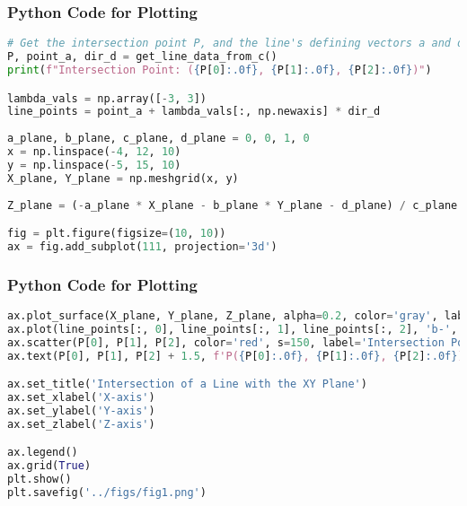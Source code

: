 \documentclass{beamer}
\theoremstyle{remark}
\numberwithin{equation}{section}
\begin{document}
\begin{frame}[fragile]
\frametitle{Python Code for Plotting}
\begin{lstlisting}[language=Python]
# Get the intersection point P, and the line's defining vectors a and d
P, point_a, dir_d = get_line_data_from_c()
print(f"Intersection Point: ({P[0]:.0f}, {P[1]:.0f}, {P[2]:.0f})")

lambda_vals = np.array([-3, 3])
line_points = point_a + lambda_vals[:, np.newaxis] * dir_d
 
a_plane, b_plane, c_plane, d_plane = 0, 0, 1, 0
x = np.linspace(-4, 12, 10)   
y = np.linspace(-5, 15, 10)   
X_plane, Y_plane = np.meshgrid(x, y)
 
Z_plane = (-a_plane * X_plane - b_plane * Y_plane - d_plane) / c_plane

fig = plt.figure(figsize=(10, 10))
ax = fig.add_subplot(111, projection='3d')

\end{lstlisting}
\end{frame}

\begin{frame}[fragile]
\frametitle{Python Code for Plotting}
\begin{lstlisting}[language=Python] 
ax.plot_surface(X_plane, Y_plane, Z_plane, alpha=0.2, color='gray', label='XY Plane')
ax.plot(line_points[:, 0], line_points[:, 1], line_points[:, 2], 'b-', label='The Line')
ax.scatter(P[0], P[1], P[2], color='red', s=150, label='Intersection Point')
ax.text(P[0], P[1], P[2] + 1.5, f'P({P[0]:.0f}, {P[1]:.0f}, {P[2]:.0f})', ha='center')

ax.set_title('Intersection of a Line with the XY Plane')
ax.set_xlabel('X-axis')
ax.set_ylabel('Y-axis')
ax.set_zlabel('Z-axis')

ax.legend()
ax.grid(True)
plt.show()
plt.savefig('../figs/fig1.png')
\end{lstlisting}
\end{frame}
\end{document}
